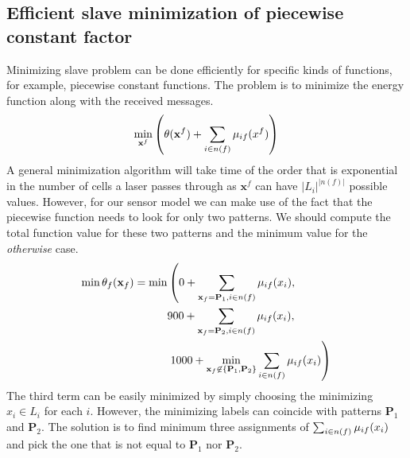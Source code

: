 \documentclass[letterpaper, 10 pt, conference]{ieeeconf} %
\DeclareMathOperator*{\argmin}{arg\,min}
\newcommand{\vect}[1]{\mathbf{#1}}
\begin{document}
\subsection{Efficient slave minimization of piecewise constant factor}
Minimizing slave problem can be done efficiently for specific kinds of functions, for example, piecewise constant functions.
The problem is to minimize the energy function along with the received messages.
\begin{align}
  \min_{\vect{x}^f} \left( \theta(\vect{x}^f) + \sum_{i \in n(f)}\msg{i}{f}{x^f} \right)
\end{align}
A general minimization algorithm will take time of the order that is exponential in the number of cells a laser passes through as $\vect{x}^f$ can have $|L_i|^{|n(f)|}$ possible values. However, for our sensor model we can make use of the fact that the piecewise function needs to look for only two patterns. We should compute the total function value for these two patterns and the minimum value for the \emph{otherwise} case. 
\begin{align}
    \min \theta_f(\vect{x}_f) = \min &\left( 0 + \sum_{\vect{x}_f = \vect{P}_1, i \in n(f)}\msg{i}{f}{x_i},\right.\\
                            &900 + \sum_{\vect{x}_f = \vect{P}_2, i \in n(f)}\msg{i}{f}{x_i},\\
                            &\left.1000 + \min_{\vect{x}_f \not\in \{\vect{P}_1, \vect{P}_2\}} \sum_{i \in n(f)}\msg{i}{f}{x_i} \right)
\end{align}
The third term can be easily minimized by 
simply choosing the minimizing $x_i \in L_i$ for each $i$. However, the minimizing labels can coincide with patterns $\vect{P}_1$ and $\vect{P}_2$. The solution is to find minimum three assignments of $\sum_{i \in n(f)}\mu_{if}(x_i)$ and pick the one that is not equal to $\vect{P}_1$ nor $\vect{P}_2$. 

%
\end{document}
